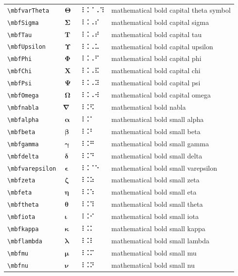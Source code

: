 \documentclass[oneside]{article}
\begin{document}
\begin{longtable}{llll}
\verb|\mbfvarTheta| & $\mbfvarTheta$ &  ⠸⠨⠈⠠⠹  & {mathematical bold capital theta symbol} \\[2ex]
\verb|\mbfSigma| & $\mbfSigma$ &  ⠸⠨⠠⠎  & {mathematical bold capital sigma} \\[2ex]
\verb|\mbfTau| & $\mbfTau$ &  ⠸⠨⠠⠞  & {mathematical bold capital tau} \\[2ex]
\verb|\mbfUpsilon| & $\mbfUpsilon$ &  ⠸⠨⠠⠥  & {mathematical bold capital upsilon} \\[2ex]
\verb|\mbfPhi| & $\mbfPhi$ &  ⠸⠨⠠⠋  & {mathematical bold capital phi} \\[2ex]
\verb|\mbfChi| & $\mbfChi$ &  ⠸⠨⠠⠯  & {mathematical bold capital chi} \\[2ex]
\verb|\mbfPsi| & $\mbfPsi$ &  ⠸⠨⠠⠽  & {mathematical bold capital psi} \\[2ex]
\verb|\mbfOmega| & $\mbfOmega$ &  ⠸⠨⠠⠺  & {mathematical bold capital omega} \\[2ex]
\verb|\mbfnabla| & $\mbfnabla$ &  ⠸⠨⠫  & {mathematical bold nabla} \\[2ex]
\verb|\mbfalpha| & $\mbfalpha$ &  ⠸⠨⠁  & {mathematical bold small alpha} \\[2ex]
\verb|\mbfbeta| & $\mbfbeta$ &  ⠸⠨⠃  & {mathematical bold small beta} \\[2ex]
\verb|\mbfgamma| & $\mbfgamma$ &  ⠸⠨⠛  & {mathematical bold small gamma} \\[2ex]
\verb|\mbfdelta| & $\mbfdelta$ &  ⠸⠨⠙  & {mathematical bold small delta} \\[2ex]
\verb|\mbfvarepsilon| & $\mbfvarepsilon$ &  ⠸⠨⠈⠑  & {mathematical bold small varepsilon} \\[2ex]
\verb|\mbfzeta| & $\mbfzeta$ &  ⠸⠨⠵  & {mathematical bold small zeta} \\[2ex]
\verb|\mbfeta| & $\mbfeta$ &  ⠸⠨⠱  & {mathematical bold small eta} \\[2ex]
\verb|\mbftheta| & $\mbftheta$ &  ⠸⠨⠹  & {mathematical bold small theta} \\[2ex]
\verb|\mbfiota| & $\mbfiota$ &  ⠸⠨⠊  & {mathematical bold small iota} \\[2ex]
\verb|\mbfkappa| & $\mbfkappa$ &  ⠸⠨⠅  & {mathematical bold small kappa} \\[2ex]
\verb|\mbflambda| & $\mbflambda$ &  ⠸⠨⠇  & {mathematical bold small lambda} \\[2ex]
\verb|\mbfmu| & $\mbfmu$ &  ⠸⠨⠍  & {mathematical bold small mu} \\[2ex]
\verb|\mbfnu| & $\mbfnu$ &  ⠸⠨⠝  & {mathematical bold small nu} \\[2ex]

\end{longtable}
\end{document}
